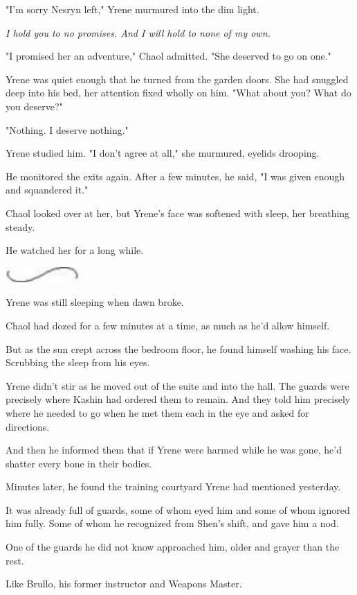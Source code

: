 "I'm sorry Nesryn left," Yrene murmured into the dim light.

\emph{I hold you to no promises. And I will hold to none of my own.}

"I promised her an adventure," Chaol admitted. "She deserved to go on one."

Yrene was quiet enough that he turned from the garden doors. She had snuggled deep into his bed, her attention fixed wholly on him. "What about you? What do you deserve?"

"Nothing. I deserve nothing."

Yrene studied him. "I don't agree at all," she murmured, eyelids drooping.

He monitored the exits again. After a few minutes, he said, "I was given enough and squandered it."

Chaol looked over at her, but Yrene's face was softened with sleep, her breathing steady.

He watched her for a long while.

\includegraphics[width=1.12in,height=0.24in]{images/seperator}

Yrene was still sleeping when dawn broke.

Chaol had dozed for a few minutes at a time, as much as he'd allow himself.

But as the sun crept across the bedroom floor, he found himself washing his face. Scrubbing the sleep from his eyes.

Yrene didn't stir as he moved out of the suite and into the hall. The guards were precisely where Kashin had ordered them to remain. And they told him precisely where he needed to go when he met them each in the eye and asked for directions.

And then he informed them that if Yrene were harmed while he was gone, he'd shatter every bone in their bodies.

Minutes later, he found the training courtyard Yrene had mentioned yesterday.

It was already full of guards, some of whom eyed him and some of whom ignored him fully. Some of whom he recognized from Shen's shift, and gave him a nod.

One of the guards he did not know approached him, older and grayer than the rest.

Like Brullo, his former instructor and Weapons Master.

